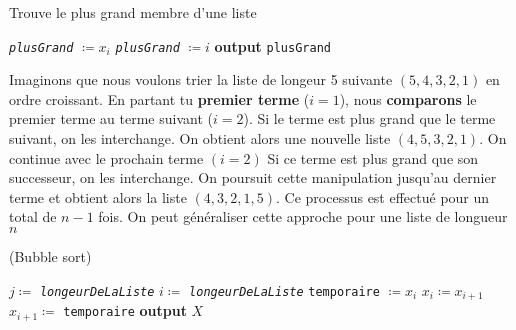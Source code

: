 \documentclass[16pt]{report}
\begin{document}
\begin{multicols*}{2}
        \begin{EExample}{Trouve le plus grand membre d'une liste}{}
            \begin{algorithm}[H]
                        \SetAlgoLined 
                        \DontPrintSemicolon
                        \textit{\texttt{plusGrand}} $\coloneqq  x_i$ \; 
                         {
                             {
                                \textit{\texttt{plusGrand}} $\coloneqq i$\; 
                            }
                        }  
                        \textbf{output} \texttt{plusGrand}    
            \end{algorithm}
        \end{EExample}

        Imaginons que nous voulons trier la liste de longeur 5 suivante $(5, 4, 3, 2, 1)$ en ordre 
        croissant. En partant tu \textbf{premier terme} ($i = 1$), nous \textbf{comparons} le premier terme 
        au terme suivant ($i = 2$). Si le terme est plus grand que le terme suivant, on les interchange. 
        On obtient alors une nouvelle liste $(4, 5, 3, 2, 1 )$. On continue avec le prochain terme 
        $(i = 2)$ Si ce terme est plus grand que son successeur, on les interchange. On poursuit cette manipulation
        jusqu'au dernier terme et obtient alors la liste $(4, 3, 2, 1, 5)$. Ce processus est effectué 
        pour un total de $n - 1$ fois. On peut généraliser cette approche pour une liste de longueur $n$ 


        \begin{algorithm}[H]
                        \caption{(Bubble sort)\label{alg:three}}
                        \SetAlgoLined
                        \DontPrintSemicolon
                        $j \coloneqq$ \textit{\texttt{longeurDeLaListe}} \; 
                        $i \coloneqq$ \textit{\texttt{longeurDeLaListe}} \;                       
                         {
                             {
                                 {
                                    \texttt{temporaire} $\coloneqq x_i$ \; 
                                    $x_i \coloneqq x_{i+1}$ \; 
                                    $x_{i+1} \coloneqq$ \texttt{temporaire}\;
                                }
                            }
                        }
                        \textbf{output} $X$ \;
        \end{algorithm}


\end{multicols*}
\end{document}
